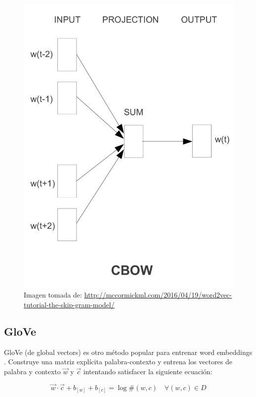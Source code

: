 \begin{figure}[h]
	\centering
	\includegraphics[scale=0.55]{pics/CBOW.png}
	\caption{Imagen tomada de: \url{http://mccormickml.com/2016/04/19/word2vec-tutorial-the-skip-gram-model/}}
\end{figure}

\subsection{GloVe}
GloVe (de global vectors) es otro método popular para entrenar word embeddings \cite{penningtonSM14}. Construye una matriz explícita palabra-contexto y entrena los vectores de palabra y contexto $\vec{w}$ y $\vec{c}$ intentando satisfacer la siguiente ecuación:

\begin{equation}
\vec{w} \cdot \vec{c} + b_{[w]}+b_{[c]} = \log \#(w,c) \quad \forall (w,c) \in D
\end{equation}

